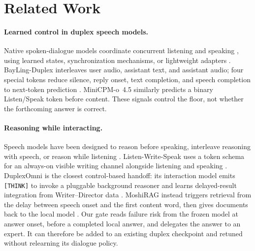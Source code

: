 \section{Related Work}
\label{sec:related}
\paragraph{Learned control in duplex speech models.}
Native spoken-dialogue models coordinate concurrent listening and speaking
\citep{defossez2024moshi,openbmb2026minicpmo}, using learned states,
synchronization mechanisms, or lightweight adapters
\citep{wang2024fsm,zhang2024duplex,veluri2024syncllm,wang2024freezeomni}.
BayLing-Duplex interleaves user audio, assistant text, and assistant audio; four
special tokens reduce silence, reply onset, text completion, and speech
completion to next-token prediction \citep{bayling2026duplex}. MiniCPM-o~4.5
similarly predicts a binary Listen/Speak token before content. These signals
control the floor, not whether the forthcoming answer is correct.

\paragraph{Reasoning while interacting.}
Speech models have been designed to reason before speaking, interleave
reasoning with speech, or reason while listening
\citep{chrono2026thinking}. Listen-Write-Speak uses a token schema for an
always-on visible writing channel alongside listening and speaking
\citep{zhang2026liberating}. DuplexOmni is the closest control-based handoff:
its interaction model emits \texttt{[THINK]} to invoke a pluggable background
reasoner and learns delayed-result integration from Writer--Director data
\citep{huang2026duplexomni}. MoshiRAG instead triggers retrieval from the delay
between speech onset and the first content word, then gives documents back to
the local model \citep{chien2026moshirag}. Our gate reads failure risk from the
frozen model at answer onset, before a completed local answer, and delegates the
answer to an expert. It can therefore be added to an existing duplex checkpoint
and retuned without relearning its dialogue policy.

